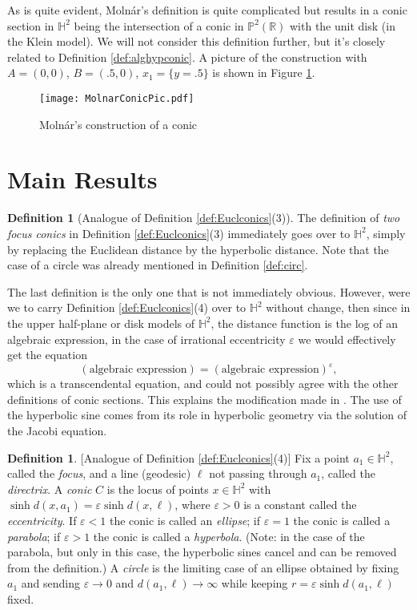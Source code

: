 \documentclass[12pt]{amsart}
\theoremstyle{definition}
\newtheorem{definition}[theorem]{Definition}
\begin{document}
As is quite evident, Moln\'ar's definition is quite complicated but
results in a conic section in ${\mathbb H}^2$ being the intersection of a conic in
${\mathbb P}^2({\mathbb R})$ with the unit disk (in the Klein model). We will not
consider this definition further, but it's closely related to
Definition \ref{def:alghypconic}. A picture of the construction with
$A=(0,0)$, $B=(.5,0)$, $x_1=\{y=.5\}$ is shown in Figure
\ref{fig:MolnarConic}. 
\begin{figure}[hbt]
  \begin{center}
    \texttt{[image: MolnarConicPic.pdf]}
    \end{center}
\caption{Moln\'ar's construction of a conic}
\label{fig:MolnarConic}
\end{figure}

\section{Main Results}
\label{sec:results}

\begin{definition}[{Analogue of Definition \ref{def:Euclconics}(3)}]
\label{def:twofocushypconic}
The definition of \emph{two focus conics} in Definition
\ref{def:Euclconics}(3) immediately goes over to ${\mathbb H}^2$, simply by
replacing the Euclidean distance by the hyperbolic distance.  Note
that the case of a circle was already mentioned in
Definition \ref{def:circ}.
\end{definition}
The last definition is the only one that is not immediately
obvious. However, were we to carry Definition \ref{def:Euclconics}(4)
over to ${\mathbb H}^2$ without change, then since in the upper half-plane
or disk models of ${\mathbb H}^2$, the distance function is the log of an
algebraic expression, in the case of irrational eccentricity $\varepsilon$ we
would effectively get the equation 
\[
(\text{algebraic expression}) = (\text{algebraic expression})^\varepsilon,
\]
which is a transcendental equation, and could not possibly agree with
the other definitions of conic sections.  This explains the
modification made in \cite{MR1505334}.  The use of the hyperbolic sine
comes from its role in hyperbolic geometry via the solution of the
Jacobi equation.
\begin{definition}
\label{def:focdirhypconic}[{Analogue of Definition
    \ref{def:Euclconics}(4)}]
Fix a point $a_1\in {\mathbb H}^2$, called the \emph{focus}, and a line 
(geodesic) $\ell$ not passing   through $a_1$, called the
\emph{directrix}. A \emph{conic} $C$ is the locus of 
  points $x\in {\mathbb H}^2$ with $\sinh d(x,a_1)=\varepsilon \sinh d(x,
  \ell)$, where $\varepsilon>0$  
  is a constant called the \emph{eccentricity}. If $\varepsilon<1$ the conic is
  called an \emph{ellipse}; if $\varepsilon=1$ the conic is
  called a \emph{parabola}; if $\varepsilon>1$ the conic is
  called a \emph{hyperbola}. (Note: in the case of the parabola, but
  only in this case, the hyperbolic sines cancel and can be removed
  from the definition.) A \emph{circle} is the limiting case of an
  ellipse obtained by fixing $a_1$ and sending $\varepsilon\to 0$ and $d(a_1,
  \ell)\to \infty$ while keeping $r=\varepsilon \sinh d(a_1, \ell)$ fixed.
\end{definition}
\end{document}
